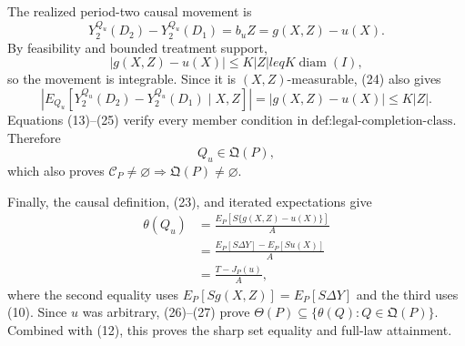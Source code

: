 The realized period-two causal movement is
\[
Y_2^{Q_u}(D_2)-Y_2^{Q_u}(D_1)
=b_uZ=g(X,Z)-u(X). \tag{23}
\]
By feasibility and bounded treatment support,
\[
|g(X,Z)-u(X)|\leq K|Z|leq K\operatorname{diam}(I), \tag{24}
\]
so the movement is integrable. Since it is \((X,Z)\)-measurable, (24) also gives
\[
\left|E_{Q_u}[Y_2^{Q_u}(D_2)-Y_2^{Q_u}(D_1)\mid X,Z]\right|
=|g(X,Z)-u(X)|
\leq K|Z|. \tag{25}
\]
Equations (13)--(25) verify every member condition in \(\text{def:legal-completion-class}\). Therefore
\[
Q_u\in\mathfrak Q(P), \tag{26}
\]
which also proves \(\mathcal C_P\neq\varnothing\Rightarrow\mathfrak Q(P)\neq\varnothing\).

Finally, the causal definition, (23), and iterated expectations give
\[
\begin{aligned}
\theta(Q_u)
&=\frac{E_P[S\{g(X,Z)-u(X)\}]}{A}\\
&=\frac{E_P[S\Delta Y]-E_P[Su(X)]}{A}\\
&=\frac{T-J_P(u)}{A},
\end{aligned} \tag{27}
\]
where the second equality uses \(E_P[Sg(X,Z)]=E_P[S\Delta Y]\) and the third uses (10). Since \(u\) was arbitrary, (26)--(27) prove \(\Theta(P)\subseteq\{\theta(Q):Q\in\mathfrak Q(P)\}\). Combined with (12), this proves the sharp set equality and full-law attainment.

